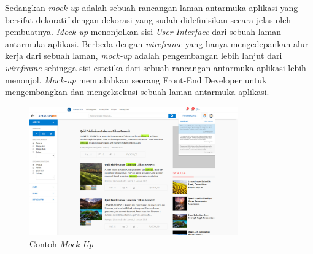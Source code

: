 	Sedangkan \textit{mock-up} adalah sebuah rancangan laman antarmuka aplikasi yang bersifat dekoratif dengan dekorasi yang sudah didefinisikan secara jelas oleh pembuatnya. \textit{Mock-up} menonjolkan sisi \textit{User Interface} dari sebuah laman antarmuka aplikasi. Berbeda dengan \textit{wireframe} yang hanya mengedepankan alur kerja dari sebuah laman, \textit{mock-up} adalah pengembangan lebih lanjut dari \textit{wireframe} sehingga sisi estetika dari sebuah rancangan antarmuka aplikasi lebih menonjol. \textit{Mock-up} memudahkan seorang Front-End Developer untuk mengembangkan dan mengeksekusi sebuah laman antarmuka aplikasi.
	\begin{figure}[H]
		\centering
		\includegraphics[origin=c,width=0.8\textwidth]{gambar/kompas/mock-up}
		\caption{Contoh \emph{Mock-Up}}
	\end{figure}
	 
